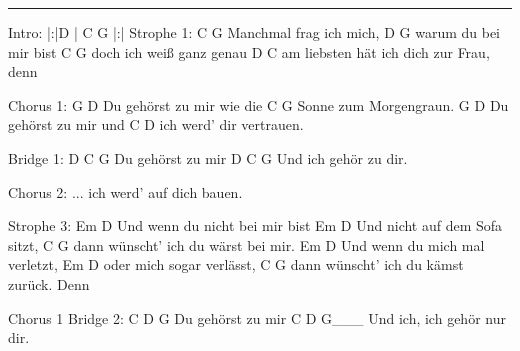 \noindent\rule{\columnwidth}{1pt}

\begin{lstsong}
Intro: |:|D  | C G |:|
Strophe 1:
C                 G
Manchmal frag ich mich,
  D              G
warum du bei mir bist
C                   G
doch ich weiß ganz genau
D                            C
am liebsten hät ich dich zur Frau, denn

Chorus 1:
G             D
Du gehörst zu mir  wie die
C               G
Sonne zum Morgengraun.
G             D
Du gehörst zu mir  und
C             D
ich werd' dir vertrauen.

Bridge 1:
D     C       G
Du gehörst zu mir
    D     C       G
Und ich gehör zu dir.

Chorus 2: ... ich werd' auf dich bauen.

Strophe 3:
     Em                   D
Und wenn du nicht bei mir bist
          Em            D
Und nicht auf dem Sofa sitzt,
        C                      G
dann wünscht' ich du wärst bei mir.
     Em                 D
Und wenn du mich mal verletzt,
     Em            D
oder mich sogar verlässt,
     C                       G
dann wünscht' ich du kämst zurück. Denn

Chorus 1
Bridge 2:
C     D       G
Du gehörst zu mir
    C        D         G___
Und ich, ich gehör nur dir.
\end{lstsong}
\newpage

\begin{comment}
Alternativer Chorus:
Du gehörst zu mir, wie die Sonne zum Morgengraun.
Du gehörst zu mir, wie keine andre Braut.

Alternative Strophe:
Manchmal frag ich mich,
ob du wirklich bist.
Denn ich fühle mich
Als ob du ein Traum bist.

Alternative Coda:
Du bist wunderschön für mich,
bitte bleibt so wie du bist.
\end{comment}


